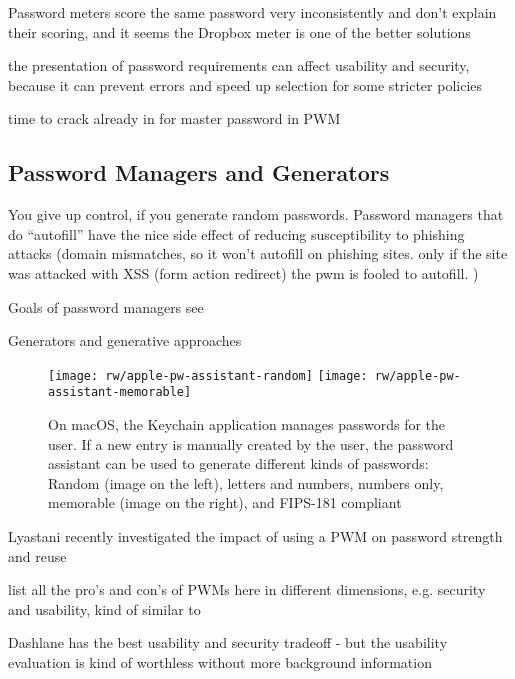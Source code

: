 	Password meters score the same password very inconsistently and don't explain their scoring, and it seems the Dropbox meter is one of the better solutions \cite{Carnavalet2014AnalyzingPWStrengthMeters}
	
	the presentation of password requirements can affect usability and security, because it can prevent errors and speed up selection for some stricter policies \cite{Shay2015SpoonfulOfSugar}
	
	time to crack already in \cite{Yee2006Passpet} for master password in PWM
	
	
	
	\subsection{Password Managers and Generators}
	
	You give up control, if you generate random passwords. 
	Password managers that do ``autofill'' have the nice side effect of reducing susceptibility to phishing attacks (domain mismatches, so it won't autofill on phishing sites. only if the site was attacked with XSS (form action redirect) the pwm is fooled to autofill. )
	
	Goals of password managers see \cite{Yee2006Passpet}
	
	Generators and generative approaches
	\begin{figure}
		\centering
		\texttt{[image: rw/apple-pw-assistant-random]}
		\texttt{[image: rw/apple-pw-assistant-memorable]}
		\caption{\label{fig:rw:pw_generators} On macOS, the Keychain application manages passwords for the user. If a new entry is manually created by the user, the password assistant can be used to generate different kinds of passwords: Random (image on the left), letters and numbers, numbers only, memorable (image on the right), and FIPS-181 compliant}
	\end{figure}
	
	Lyastani \etal recently investigated the impact of using a PWM on password strength and reuse \cite{Lyastani2017ImpactPWMPasswordStrength}
	
	list all the pro's and con's of PWMs here in different dimensions, e.g. security and usability, kind of similar to \cite{Bonneau2012ReplacePasswords}
	
	Dashlane has the best usability and security tradeoff - but the usability evaluation is kind of worthless without more background information \cite{AriasCabarcos2016ComparingPWM}
	
